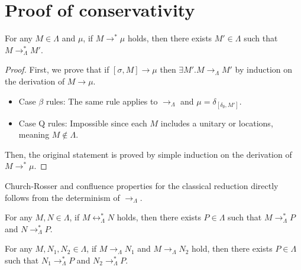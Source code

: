 \section{Proof of conservativity} \label{sec:conserv-proof}

\begin{lem} \label{lem:classical-step}
  For any $M \in \Lambda$ and $\mu$, if $M \longrightarrow^* \mu$ holds, then there exists $M' \in \Lambda$ such that $M \longrightarrow^*_\Lambda M'$.
\end{lem}
\begin{proof}
  First, we prove that if $[\sigma, M] \longrightarrow \mu$ then $\exists M'. M \longrightarrow_\Lambda M'$ by induction on the derivation of $M \longrightarrow \mu$.
  \begin{itemize}
    \item Case $\beta$ rules: The same rule applies to $\longrightarrow_\Lambda$ and $\mu = \delta_{[\delta_\emptyset, M']}$.
    \item Case \textsc{Q} rules: Impossible since each $M$ includes a unitary or locations, meaning $M \notin \Lambda$.
  \end{itemize}
  Then, the original statement is proved by simple induction on the derivation of $M \longrightarrow^* \mu$.
\end{proof}

Church-Rosser and confluence properties for the classical reduction directly follows from the determinism of $\longrightarrow_\Lambda$.
\begin{lem} \label{lem:classical-confluent}
  For any $M, N \in \Lambda$, if $M \longleftrightarrow^*_\Lambda N$ holds, then there exists $P \in \Lambda$ such that $M \longrightarrow^*_\Lambda P$ and $N \longrightarrow^*_\Lambda P$.
\end{lem}
\begin{lem} \label{lem:classical-confluent-single}
  For any $M, N_1, N_2 \in \Lambda$, if $M \longrightarrow_\Lambda N_1$ and $M \longrightarrow_\Lambda N_2$ hold, then there exists $P \in \Lambda$ such that $N_1 \longrightarrow^*_\Lambda P$ and $N_2 \longrightarrow^*_\Lambda P$.
\end{lem}

